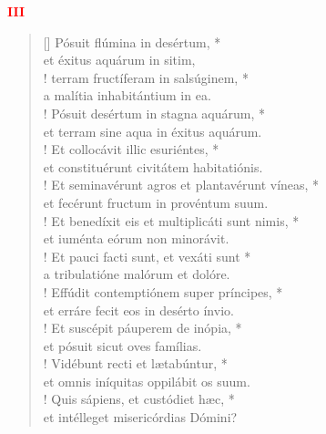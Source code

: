 \begin{center}
\textcolor{red}{\bf III}
\end{center}
\begin{verse}[\versewidth]
Pósuit flúmina in desértum, *\\
et éxitus aquárum in sitim,\\!
\vin terram fructíferam in salsúginem, *\\
\vin a malítia inhabitántium in ea.\\!
Pósuit desértum in stagna aquárum, *\\
et terram sine aqua in éxitus aquárum.\\!
\vin Et collocávit illic esuriéntes, *\\
\vin et constituérunt civitátem habitatiónis.\\!
Et seminavérunt agros et plantavérunt víneas, *\\
et fecérunt fructum in provéntum suum.\\!
\vin Et benedíxit eis et multiplicáti sunt nimis, *\\
\vin et iuménta eórum non minorávit.\\!
Et pauci facti sunt, et vexáti sunt *\\
a tribulatióne malórum et dolóre.\\!
\vin Effúdit contemptiónem super príncipes, *\\
\vin et erráre fecit eos in desérto ínvio.\\!
Et suscépit páuperem de inópia, *\\
et pósuit sicut oves famílias.\\!
\vin Vidébunt recti et lætabúntur, *\\
\vin et omnis iníquitas oppilábit os suum.\\!
Quis sápiens, et custódiet hæc, *\\
et intélleget misericórdias Dómini?\\
\end{verse}
\vspace{1cm}


